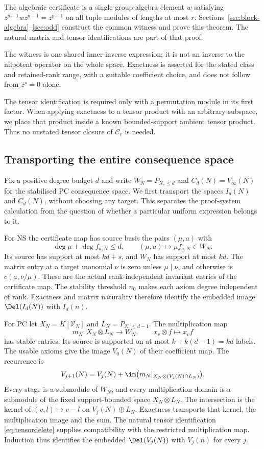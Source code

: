 The algebraic certificate is a single group-algebra element $w$ satisfying
$z^{p-1}wz^{p-1}=z^{p-1}$ on all tuple modules of lengths at most $r$.
Sections~\ref{sec:block-algebra}--\ref{sec:odd} construct the common witness and prove this theorem. The natural matrix and tensor identifications are part of that proof.

The witness is one shared inner-inverse expression; it is not an
inverse to the nilpotent operator on the whole space. Exactness is
asserted for the stated class and retained-rank range, with a suitable
coefficient choice, and does not follow from $z^p=0$ alone.

The tensor identification is required only with a permutation module in its first factor. When applying exactness to a tensor product with an arbitrary subspace, we place that product inside a known bounded-support ambient tensor product. Thus no unstated tensor closure of $\mathcal C_r$ is needed.


\subsection{Transporting the entire consequence space}
Fix a positive degree budget $d$ and write $W_N=P_{N,\le d}$
and $C_d(N)=V_\infty(N)$ for the stabilised PC consequence space.
We first transport the spaces $I_d(N)$ and $C_d(N)$, without choosing
any target. This separates the proof-system calculation from the
question of whether a particular uniform expression belongs to it.

For NS the certificate map has source basis the pairs $(\mu,a)$ with
\[
 \deg\mu+\deg f_{a,N}\le d,
 \qquad (\mu,a)\longmapsto\mu f_{a,N}\in W_N.
\]
Its source has support at most $kd+s$, and $W_N$ has support at most
$kd$. The matrix entry at a target monomial $\nu$ is zero unless
$\mu\mid\nu$, and otherwise is $c(a,\nu/\mu)$. These are the actual
rank-independent invariant entries of the certificate map. The
stability threshold $n_0$ makes each axiom degree independent of rank.
Exactness and matrix naturality therefore identify the embedded image
$\Del(I_d(N))$ with $I_d(n)$.

For PC let $X_N=K[\mathcal V_N]$ and $L_N=P_{N,\le d-1}$.
The multiplication map
\[
       m_N:X_N\otimes L_N\longrightarrow W_N,\qquad
                 x_v\otimes f\longmapsto x_vf
\]
has stable entries. Its source is supported on at most
$k+k(d-1)=kd$ labels. The usable axioms give the image $V_0(N)$
of their coefficient map. The recurrence is
\[
 V_{j+1}(N)=V_j(N)+\im\bigl(m_N|_{X_N\otimes(V_j(N)\cap L_N)}\bigr).
\]
Every stage is a submodule of $W_N$, and every multiplication domain
is a submodule of the fixed support-bounded space $X_N\otimes L_N$.
The intersection is the kernel of $(v,l)\mapsto v-l$ on
$V_j(N)\oplus L_N$. Exactness transports that kernel, the multiplication
image and the sum. The natural tensor identification
\eqref{eq:tensordelete} supplies compatibility with the restricted
multiplication map. Induction thus identifies the embedded
$\Del(V_j(N))$ with $V_j(n)$ for every $j$.

